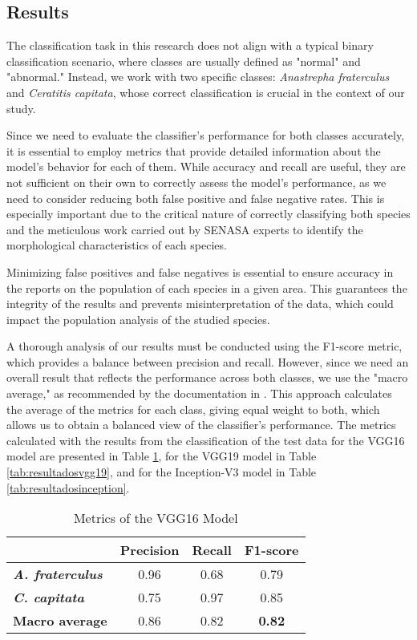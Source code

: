 \subsection{Results}
The classification task in this research does not align with a typical binary classification scenario, where classes are usually defined as "normal" and "abnormal." Instead, we work with two specific classes: \textit{Anastrepha fraterculus} and \textit{Ceratitis capitata}, whose correct classification is crucial in the context of our study.

Since we need to evaluate the classifier's performance for both classes accurately, it is essential to employ metrics that provide detailed information about the model's behavior for each of them. While accuracy and recall are useful, they are not sufficient on their own to correctly assess the model's performance, as we need to consider reducing both false positive and false negative rates. This is especially important due to the critical nature of correctly classifying both species and the meticulous work carried out by SENASA experts to identify the morphological characteristics of each species.

Minimizing false positives and false negatives is essential to ensure accuracy in the reports on the population of each species in a given area. This guarantees the integrity of the results and prevents misinterpretation of the data, which could impact the population analysis of the studied species.

A thorough analysis of our results must be conducted using the F1-score metric, which provides a balance between precision and recall. However, since we need an overall result that reflects the performance across both classes, we use the "macro average," as recommended by the documentation in \cite{scikitlearn}. This approach calculates the average of the metrics for each class, giving equal weight to both, which allows us to obtain a balanced view of the classifier's performance. The metrics calculated with the results from the classification of the test data for the VGG16 model are presented in Table \ref{tab:resultadosvgg16}, for the VGG19 model in Table \ref{tab:resultadosvgg19}, and for the Inception-V3 model in Table \ref{tab:resultadosinception}.
\begin{table}[htbp]
  \centering
  \caption{Metrics of the VGG16 Model}
  \label{tab:resultadosvgg16}
  \begin{tabular}{|l|c|c|c|}
  \hline
     & \textbf{Precision} & \textbf{Recall} & \textbf{F1-score} \\
    \hline
    \textbf{\textit{A. fraterculus}} & 0.96 & 0.68 & 0.79 \\
    \hline
    \textbf{\textit{C. capitata}} & 0.75 & 0.97 & 0.85 \\
    \hline
    \textbf{Macro average} & 0.86 & 0.82 & \textbf{0.82} \\
    \hline
  \end{tabular}
\end{table}


